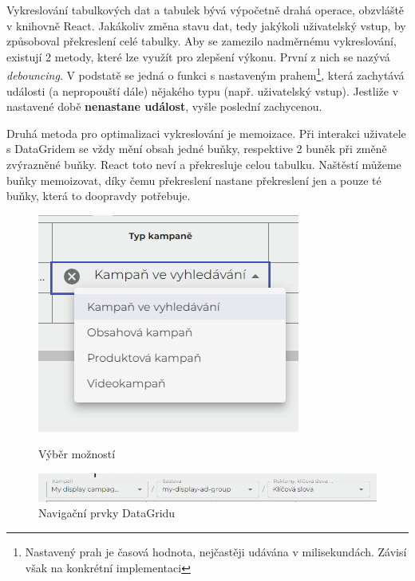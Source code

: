 Vykreslování tabulkových dat a tabulek bývá výpočetně drahá operace, obzvláště v knihovně React. Jakákoliv změna stavu dat, tedy jakýkoli uživatelský vstup, by způsoboval
překreslení celé tabulky. Aby se zamezilo nadměrnému vykreslování, existují 2 metody, které lze využít pro zlepšení výkonu. První z nich se nazývá \emph{debouncing}. V podstatě se jedná
o funkci s nastaveným prahem\footnote{Nastavený prah je časová hodnota, nejčastěji udávána v milisekundách. Závisí však na konkrétní implementaci},
která zachytává události (a nepropouští dále) nějakého typu (např. uživatelský vstup). Jestliže v nastavené době \textbf{nenastane událost}, vyšle poslední zachycenou.

Druhá metoda pro optimalizaci vykreslování je memoizace. Při interakci uživatele s DataGridem se vždy mění obsah jedné buňky, respektive 2 buněk při změně zvýrazněné buňky.
React toto neví a překresluje celou tabulku. Naštěstí můžeme buňky memoizovat, díky čemu překreslení nastane překreslení jen a pouze té buňky, která to doopravdy potřebuje.


\begin{figure}
    \begin{minipage}{.5\textwidth}
        \centering
        \includegraphics[width=.7\textwidth]{Figures/ui/cell-choices.png}
        \caption{Výběr možností}        
        \label{fig:cell-choices}
    \end{minipage}
    \begin{minipage}{.5\textwidth}
        \centering
        \includegraphics[width=1\textwidth]{Figures/ui/datagrid-controls.png}
        \caption{Navigační prvky DataGridu}        
        \label{fig:datagrid-controls}
    \end{minipage}
\end{figure}

